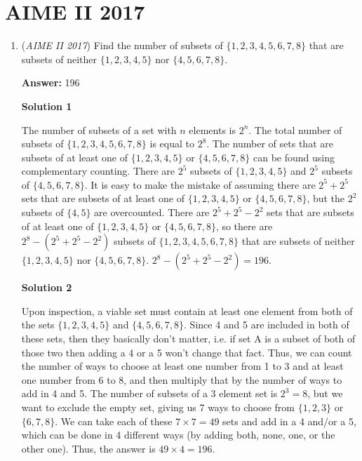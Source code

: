 \section{AIME II 2017}
        \begin{enumerate}
        	\item (\textit{AIME II 2017}) Find the number of subsets of $\{1, 2, 3, 4, 5, 6, 7, 8\}$ that are subsets of neither $\{1, 2, 3, 4, 5\}$ nor $\{4, 5, 6, 7, 8\}$.


 
 \textbf{Answer: }196



\textbf{Solution 1}

The number of subsets of a set with $n$ elements is $2^n$. The total number of subsets of $\{1, 2, 3, 4, 5, 6, 7, 8\}$ is equal to $2^8$. The number of sets that are subsets of at least one of $\{1, 2, 3, 4, 5\}$ or $\{4, 5, 6, 7, 8\}$ can be found using complementary counting. There are $2^5$ subsets of $\{1, 2, 3, 4, 5\}$ and $2^5$ subsets of $\{4, 5, 6, 7, 8\}$. It is easy to make the mistake of assuming there are $2^5+2^5$ sets that are subsets of at least one of $\{1, 2, 3, 4, 5\}$ or $\{4, 5, 6, 7, 8\}$, but the $2^2$ subsets of $\{4, 5\}$ are overcounted. There are $2^5+2^5-2^2$ sets that are subsets of at least one of $\{1, 2, 3, 4, 5\}$ or $\{4, 5, 6, 7, 8\}$, so there are $2^8-(2^5+2^5-2^2)$ subsets of $\{1, 2, 3, 4, 5, 6, 7, 8\}$ that are subsets of neither $\{1, 2, 3, 4, 5\}$ nor $\{4, 5, 6, 7, 8\}$. $2^8-(2^5+2^5-2^2)=\boxed{196}$.

 



\textbf{Solution 2}

Upon inspection, a viable set must contain at least one element from both of the sets $\{1, 2, 3, 4, 5\}$ and $\{4, 5, 6, 7, 8\}$. Since 4 and 5 are included in both of these sets, then they basically don't matter, i.e. if set A is a subset of both of those two then adding a 4 or a 5 won't change that fact. Thus, we can count the number of ways to choose at least one number from 1 to 3 and at least one number from 6 to 8, and then multiply that by the number of ways to add in 4 and 5. The number of subsets of a 3 element set is $2^3=8$, but we want to exclude the empty set, giving us 7 ways to choose from  $\{1, 2, 3\}$ or $\{6, 7, 8\}$. We can take each of these $7 \times 7=49$ sets and add in a 4 and/or a 5, which can be done in 4 different ways (by adding both, none, one, or the other one). Thus, the answer is $49 \times 4=\boxed{196}$.


\end{enumerate}
